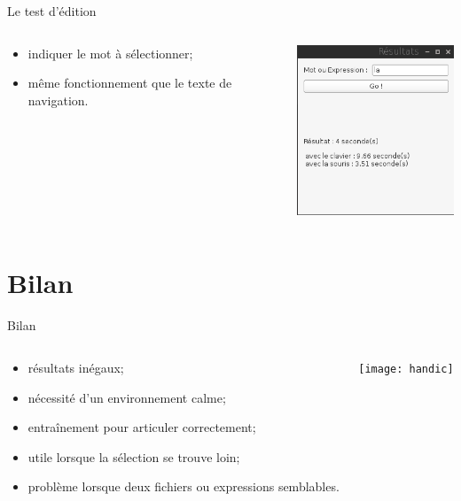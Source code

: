\documentclass{beamer}
\begin{document}
\begin{frame}{Le test d'édition}

	\begin{columns}[c]
	
	\begin{column}{5cm}
	\begin{itemize}
		\item indiquer le mot à sélectionner;
		\item même fonctionnement que le texte de navigation.
	\end{itemize}
  	\end{column}
	\begin{column}{5cm}
		\includegraphics[width=5cm]{test_edit_finish}\\
  	\end{column}

	\end{columns}

\end{frame}

	\section{Bilan}
	
\begin{frame}{Bilan}

	\begin{columns}[c]
	
	\begin{column}{5cm}
		\begin{itemize}
		\item résultats inégaux;
		\item nécessité d'un environnement calme;
		\item entraînement pour articuler correctement;
		\item utile lorsque la sélection se trouve loin;
		\item problème lorsque deux fichiers ou expressions semblables.
	\end{itemize}

  	\end{column}
	\begin{column}{5cm}
		\texttt{[image: handic]}\\
  	\end{column}

	\end{columns}


\end{frame}
\end{document}
